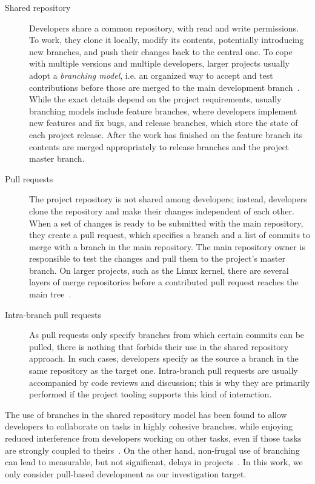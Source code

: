\documentclass{sig-alternate}
\begin{document}
\begin{description}

  \item[Shared repository] Developers share a common repository, with read and
    write permissions. To work, they clone it locally, modify its contents,
    potentially introducing new branches, and push their changes back to the
    central one. To cope with multiple versions and multiple developers, larger
    projects usually adopt a {\em branching model}, i.e. an organized way to
    accept and test contributions before those are merged to the main
    development branch~\cite{Bird12}. While the exact details depend on the
    project requirements, usually branching models include feature branches,
    where developers implement new features and fix bugs, and release branches,
    which store the state of each project release. After the work has finished
    on the feature branch its contents are merged appropriately to release
    branches and the project master branch.

  \item[Pull requests] The project repository is not shared among developers;
    instead, developers clone the repository and make their changes independent
    of each other. When a set of changes is ready to be submitted with the main
    repository, they create a pull request, which specifies a branch and a list
    of commits to merge with a branch in the main repository. The main
    repository owner is responsible to test the changes and pull them to the
    project's master branch. On larger projects, such as the Linux kernel,
    there are several layers of merge repositories before a contributed 
    pull request reaches the main tree~\cite{Cornf10}.

  \item[Intra-branch pull requests] As pull requests only specify branches from
    which certain commits can be pulled, there is nothing that forbids their use
    in the shared repository approach. In such cases, developers specify as the
    source a branch in the same repository as the target one.
    Intra-branch pull requests are usually accompanied by code reviews and
    discussion; this is why they are primarily performed if the project tooling
    supports this kind of interaction.

\end{description}

The use of branches in the shared repository model has been found to allow
developers to collaborate on tasks in highly cohesive branches, while enjoying
reduced interference from developers working on other tasks, even if those tasks
are strongly coupled to theirs~\cite{Barr12}. On the other hand, non-frugal
use of branching can lead to measurable, but not significant, delays in 
projects~\cite{Bird12}. In this work, we only consider pull-based development
as our investigation target.
\end{document}
